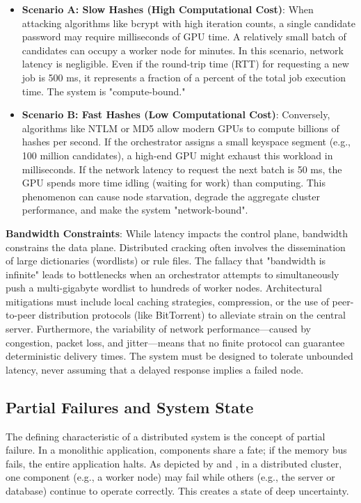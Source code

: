 \begin{itemize}
    \item \textbf{Scenario A: Slow Hashes (High Computational Cost)}: When attacking algorithms like bcrypt with high iteration counts, a single candidate password may require milliseconds of GPU time. A relatively small batch of candidates can occupy a worker node for minutes. In this scenario, network latency is negligible. Even if the round-trip time (RTT) for requesting a new job is 500 ms, it represents a fraction of a percent of the total job execution time. The system is "compute-bound."

    \item \textbf{Scenario B: Fast Hashes (Low Computational Cost)}: Conversely, algorithms like NTLM or MD5 allow modern GPUs to compute billions of hashes per second. If the orchestrator assigns a small keyspace segment (e.g., 100 million candidates), a high-end GPU might exhaust this workload in milliseconds. If the network latency to request the next batch is 50 ms, the GPU spends more time idling (waiting for work) than computing. This phenomenon can cause node starvation, degrade the aggregate cluster performance, and make the system "network-bound".
\end{itemize}

\textbf{Bandwidth Constraints}: While latency impacts the control plane, bandwidth constrains the data plane. Distributed cracking often involves the dissemination of large dictionaries (wordlists) or rule files. The fallacy that "bandwidth is infinite" leads to bottlenecks when an orchestrator attempts to simultaneously push a multi-gigabyte wordlist to hundreds of worker nodes. Architectural mitigations must include local caching strategies, compression, or the use of peer-to-peer distribution protocols (like BitTorrent) to alleviate strain on the central server. Furthermore, the variability of network performance—caused by congestion, packet loss, and jitter—means that no finite protocol can guarantee deterministic delivery times. The system must be designed to tolerate unbounded latency, never assuming that a delayed response implies a failed node.

\subsection{Partial Failures and System State}
\label{part_fails_sys_state}

The defining characteristic of a distributed system is the concept of partial failure. In a monolithic application, components share a fate; if the memory bus fails, the entire application halts. As depicted by \cite{distribution_challenges} and \cite{distribution_challenges_amazon}, in a distributed cluster, one component (e.g., a worker node) may fail while others (e.g., the server or database) continue to operate correctly. This creates a state of deep uncertainty.

